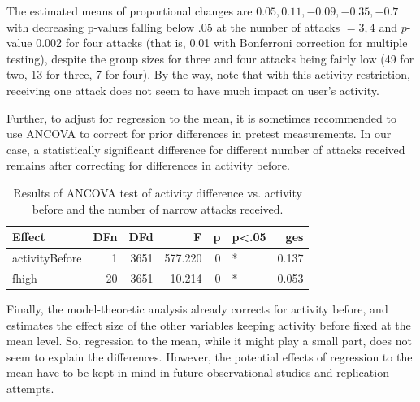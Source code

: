 \documentclass[10pt,]{scrartcl}
\newenvironment{Shaded}{\begin{snugshade}}{\end{snugshade}}
\newcommand{\KeywordTok}[1]{\textcolor[rgb]{0.13,0.29,0.53}{\textbf{#1}}}
\newcommand{\StringTok}[1]{\textcolor[rgb]{0.31,0.60,0.02}{#1}}
\newcommand{\OperatorTok}[1]{\textcolor[rgb]{0.81,0.36,0.00}{\textbf{#1}}}
\newcommand{\NormalTok}[1]{#1}
\begin{document}
\normalsize  The estimated means of proportional changes are
\(0.05, 0.11, -0.09,-0.35, -0.7\) with decreasing p-values falling below
.05 at the number of attacks \(=3, 4\) and \(p\)-value 0.002 for four
attacks (that is, 0.01 with Bonferroni correction for multiple testing),
despite the group sizes for three and four attacks being fairly low (49
for two, 13 for three, 7 for four). By the way, note that with this
activity restriction, receiving one attack does not seem to have much
impact on user's activity.

Further, to adjust for regression to the mean, it is sometimes
recommended to use ANCOVA to correct for prior differences in pretest
measurements. In our case, a statistically significant difference for
different number of attacks received remains after correcting for
differences in activity before.

\footnotesize

\begin{Shaded}
\end{Shaded}

\normalsize

\begin{table}
\footnotesize

\begin{tabular}{l|r|r|r|r|l|r}
\hline
Effect & DFn & DFd & F & p & p<.05 & ges\\
\hline
activityBefore & 1 & 3651 & 577.220 & 0 & * & 0.137\\
\hline
fhigh & 20 & 3651 & 10.214 & 0 & * & 0.053\\
\hline
\end{tabular}
\normalsize 
\caption{Results of ANCOVA test of activity difference vs. activity before and the number of narrow attacks received.}
\end{table}

Finally, the model-theoretic analysis already corrects for activity
before, and estimates the effect size of the other variables keeping
activity before fixed at the mean level. So, regression to the mean,
while it might play a small part, does not seem to explain the
differences. However, the potential effects of regression to the mean
have to be kept in mind in future observational studies and replication
attempts.
\end{document}
